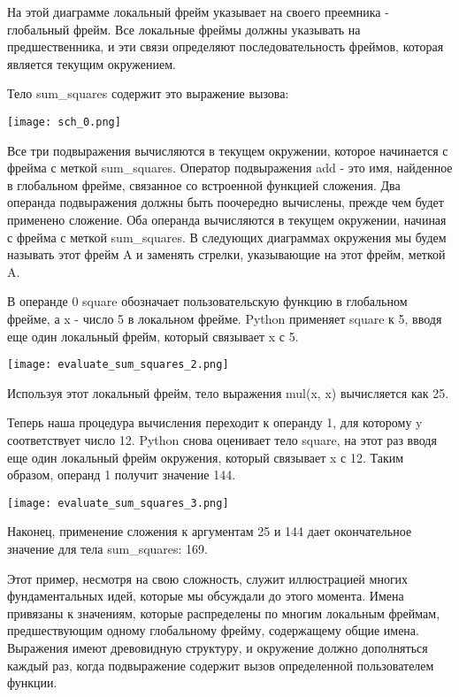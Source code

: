 На этой диаграмме локальный фрейм указывает на своего преемника - глобальный фрейм.
Все локальные фреймы должны указывать на предшественника, и эти связи определяют последовательность фреймов, которая является текущим окружением.

Тело sum\_squares содержит это выражение вызова:
\begin{center}
  \texttt{[image: sch\_0.png]}
\end{center}

Все три подвыражения вычисляются в текущем окружении, которое начинается с фрейма с меткой sum\_squares.
Оператор подвыражения add - это имя, найденное в глобальном фрейме, связанное со встроенной функцией сложения.
Два операнда подвыражения должны быть поочередно вычислены, прежде чем будет применено сложение.
Оба операнда вычисляются в текущем окружении, начиная с фрейма с меткой sum\_squares.
В следующих диаграммах окружения мы будем называть этот фрейм A и заменять стрелки, указывающие на этот фрейм, меткой A.

В операнде 0 square обозначает пользовательскую функцию в глобальном фрейме, а x - число 5 в локальном фрейме.
Python применяет square к 5, вводя еще один локальный фрейм, который связывает x с 5.
\begin{center}
  \texttt{[image: evaluate\_sum\_squares\_2.png]}
\end{center}

Используя этот локальный фрейм, тело выражения mul(x, x) вычисляется как 25.

Теперь наша процедура вычисления переходит к операнду 1, для которому y соответствует число 12.
Python снова оценивает тело square, на этот раз вводя еще один локальный фрейм окружения, который связывает x с 12. Таким образом, операнд 1 получит значение 144.
\begin{center}
  \texttt{[image: evaluate\_sum\_squares\_3.png]}
\end{center}

Наконец, применение сложения к аргументам 25 и 144 дает окончательное значение для тела sum\_squares: 169.

Этот пример, несмотря на свою сложность, служит иллюстрацией многих фундаментальных идей, которые мы обсуждали до этого момента.
Имена привязаны к значениям, которые распределены по многим локальным фреймам, предшествующим одному глобальному фрейму, содержащему общие имена.
Выражения имеют древовидную структуру, и окружение должно дополняться каждый раз, когда подвыражение содержит вызов определенной пользователем функции.

